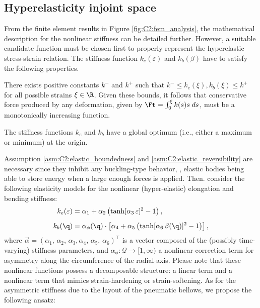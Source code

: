 \subsection{Hyperelasticity \editl in\editr joint space}
\label{sec:C2:hyperelastic}
\noindent From the finite element results in Figure \ref{fig:C2:fem_analysis}, the mathematical description for the nonlinear stiffness can be detailed further. However, a suitable candidate function must be chosen first to properly represent the hyperelastic stress-strain relation. The stiffness function $k_e (\varepsilon)$ and $k_b (\beta)$  have to satisfy the following properties.
%
\begin{asm}
\label{asm:C2:elastic_boundedness}
There exists positive constants ${k}^{-}$ and ${k}^{+}$ such that ${k}^{-} \le k_e(\xi),k_b(\xi) \le {k}^{+}$ for all possible strains $\xi \in \R$. \editl Given these bounds, it follows that conservative force produced by any deformation, given by ${\Ft} = \int_0^\xi k(s)s\;ds$, must be a monotonically increasing function. \editr 
\end{asm}
%
\begin{asm}
\label{asm:C2:elastic_reversibility}
The stiffness functions $k_e$ and $k_b$ have a global optimum (i.e., either a maximum or minimum) at the origin. 
\end{asm}
%
Assumption \ref{asm:C2:elastic_boundedness} and \ref{asm:C2:elastic_reversibility} are necessary since \editl they inhibit any buckling-type behavior, \ie, elastic bodies being able to store energy when a large enough forces is applied. Then. consider the following elasticity models for the nonlinear (hyper-elastic) elongation and bending stiffness:
%
\begin{align}
\label{eq:C2:stiffness_tanh_eps}
{k}_e(\varepsilon) & = \alpha_1 + \alpha_2 \left( \tanh[\alpha_3\,\varepsilon]^2 - 1 \right), \\[0.5em]
\label{eq:C2:stiffness_tanh_beta}
{k}_b(\q)  & = \alpha_{\phi}(\q) \cdot \left[\alpha_4 + \alpha_5 \left( \tanh[\alpha_6\,\beta(\q)]^2 - 1 \right)\right], 
\end{align}
%
where $\vec{\alpha} = \left(\alpha_1,\,\alpha_2,\,\alpha_3,\alpha_4,\,\alpha_5,\,\alpha_6 \right)^\top$ is a vector composed of the (possibly time-varying) stiffness parameters, and $\alpha_\phi: \mathcal{Q} \to [1,\infty)$ a nonlinear correction term for asymmetry along the circumference of the radial-axis. Please note that these nonlinear functions possess a decomposable structure: a linear term and a nonlinear term that mimics strain-hardening or strain-softening. As for the asymmetric stiffness due to the layout of the pneumatic bellows, we propose the following ansatz:
